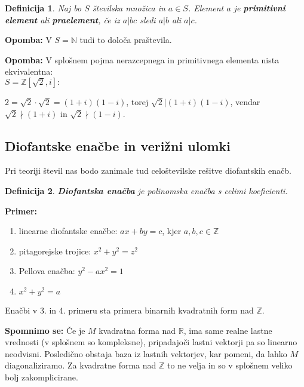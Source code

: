 \documentclass[12pt, a4paper]{article}
\newtheorem{defi}{Definicija}
\newenvironment{prim}[1][]{\par\medskip\noindent \textbf{Primer: }}{\medskip}
\newenvironment{opom}[1][]{\par\medskip\noindent \textbf{Opomba: }}{\medskip}
\newenvironment{spom}[1][]{\par\medskip\noindent \textbf{Spomnimo se: }}{\medskip}
\begin{document}
\begin{defi}
Naj bo $S$ številska množica in $a\in S$. Element $a$ je \textbf{primitivni element} ali \textbf{praelement}, če iz $a|bc$ sledi $a|b$ ali $a|c$.
\end{defi}

\begin{opom}
V $S=\mathbb{N}$ tudi to določa praštevila.
\end{opom}

\begin{opom}
V splošnem pojma nerazcepnega in primitivnega elementa nista ekvivalentna: \\
$S=\mathbb{Z}[\sqrt{2}, i]:$

$2=\sqrt{2} \cdot \sqrt{2}=(1+i)(1-i)$, torej $\sqrt{2} | (1+i)(1-i)$, vendar $\sqrt{2} \nmid (1+i)$ in $\sqrt{2} \nmid (1-i)$.
\end{opom}

\subsection{Diofantske enačbe in verižni ulomki}

Pri teoriji števil nas bodo zanimale tud celoštevilske rešitve diofantskih enačb.

\begin{defi}
\textbf{Diofantska enačba} je polinomska enačba s celimi koeficienti.
\end{defi}

\begin{prim}
\begin{enumerate}
\item linearne diofantske enačbe: $ax+by=c$, kjer $a,b,c \in \mathbb{Z}$
\item pitagorejske trojice: $x^{2} + y^{2} = z^{2}$
\item Pellova enačba: $y^{2}-ax^{2}=1$
\item $x^{2} + y^{2} = a$
\end{enumerate}
\end{prim}

Enačbi v 3. in 4. primeru sta primera binarnih kvadratnih form nad $\mathbb{Z}$. 

\begin{spom}
Če je $M$ kvadratna forma nad $\mathbb{R}$, ima same realne lastne vrednosti (v splošnem so kompleksne), pripadajoči lastni vektorji pa so linearno neodvisni. Posledično obstaja baza iz lastnih vektorjev, kar pomeni, da lahko $M$ diagonaliziramo. Za kvadratne forma nad $\mathbb{Z}$ to ne velja in so v splošnem veliko bolj zakomplicirane.
\end{spom}
\end{document}

